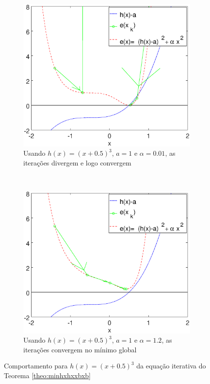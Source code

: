 \begin{figure}[!h]
    \centering
    \begin{subfigure}[b]{0.45\textwidth}
        \includegraphics[width=\textwidth]{chapters/minimization-hx/mfiles/hx3_a_alphax/minimizando_hx_a_alphax_1.eps}
        \caption{Usando $h(x)=(x+0.5)^3$, $a=1$ e $\alpha=0.01$, as iterações divergem e logo convergem}
        \label{fig:hx3bcasesa}
    \end{subfigure}
    ~ %
    \begin{subfigure}[b]{0.45\textwidth}
        \includegraphics[width=\textwidth]{chapters/minimization-hx/mfiles/hx3_a_alphax/minimizando_hx_a_alphax_2.eps}
        \caption{Usando $h(x)=(x+0.5)^3$, $a=1$ e $\alpha=1.2$, as iterações convergem no mínimo global}
        \label{fig:hx3bcasesb}
    \end{subfigure}
    \caption{Comportamento para $h(x)=(x+0.5)^3$ da equação iterativa do Teorema \ref{theo:minhxhxxbxb}}
    \label{fig:hx3bcases}
\end{figure}
